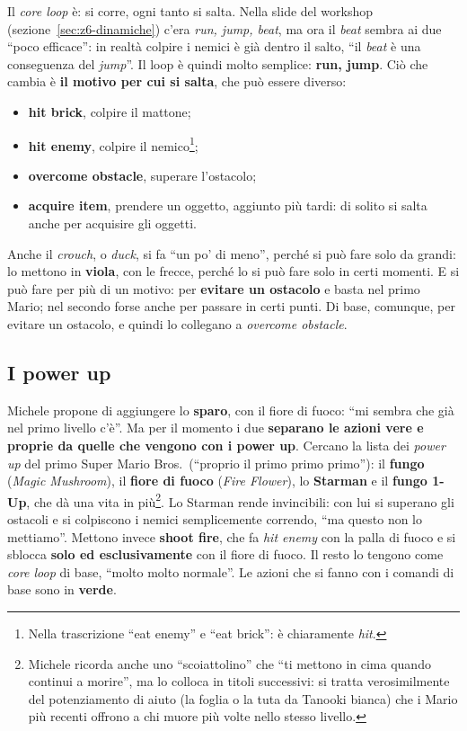 Il \emph{core loop} è: si corre, ogni tanto si salta. Nella slide del workshop
(sezione~\ref{sec:z6-dinamiche}) c'era \emph{run, jump, beat}, ma ora il
\emph{beat} sembra ai due ``poco efficace'': in realtà colpire i nemici è già
dentro il salto, ``il \emph{beat} è una conseguenza del \emph{jump}''. Il loop
è quindi molto semplice: \textbf{run, jump}. Ciò che cambia è \textbf{il motivo per
cui si salta}, che può essere diverso:
\begin{itemize}
  \item \textbf{hit brick}, colpire il mattone;
  \item \textbf{hit enemy}, colpire il nemico\footnote{Nella trascrizione ``eat
        enemy'' e ``eat brick'': è chiaramente \emph{hit}.};
  \item \textbf{overcome obstacle}, superare l'ostacolo;
  \item \textbf{acquire item}, prendere un oggetto, aggiunto più tardi: di solito
        si salta anche per acquisire gli oggetti.
\end{itemize}
Anche il \emph{crouch}, o \emph{duck}, si fa ``un po' di meno'', perché si può
fare solo da grandi: lo mettono in \textbf{viola}, con le frecce, perché lo si
può fare solo in certi momenti. E si può fare per più di un motivo: per
\textbf{evitare un ostacolo} e basta nel primo Mario; nel secondo forse anche per
passare in certi punti. Di base, comunque, per evitare un ostacolo, e quindi lo
collegano a \emph{overcome obstacle}.

\subsection{I power up}

Michele propone di aggiungere lo \textbf{sparo}, con il fiore di fuoco: ``mi
sembra che già nel primo livello c'è''. Ma per il momento i due
\textbf{separano le azioni vere e proprie da quelle che vengono con i power
up}. Cercano la lista dei \emph{power up} del primo Super Mario Bros.\
(``proprio il primo primo primo''): il \textbf{fungo} (\emph{Magic Mushroom}), il
\textbf{fiore di fuoco} (\emph{Fire Flower}), lo \textbf{Starman} e il
\textbf{fungo 1-Up}, che dà una vita in più\footnote{Michele ricorda anche uno
``scoiattolino'' che ``ti mettono in cima quando continui a morire'', ma lo
colloca in titoli successivi: si tratta verosimilmente del potenziamento di
aiuto (la foglia o la tuta da Tanooki bianca) che i Mario più recenti offrono a
chi muore più volte nello stesso livello.}. Lo Starman rende invincibili: con lui
si superano gli ostacoli e si colpiscono i nemici semplicemente correndo, ``ma
questo non lo mettiamo''. Mettono invece \textbf{shoot fire}, che fa
\emph{hit enemy} con la palla di fuoco e si sblocca \textbf{solo ed
esclusivamente} con il fiore di fuoco. Il resto lo tengono come \emph{core loop}
di base, ``molto molto normale''. Le azioni che si fanno con i comandi di base
sono in \textbf{verde}.

